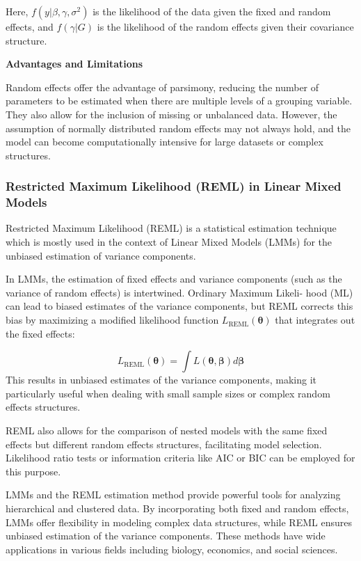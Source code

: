 \documentclass[12pt, twoside,hidelinks]{article}
\theoremstyle{definition}
\numberwithin{equation}{section}
\begin{document}
Here, \( f(y | \beta, \gamma, \sigma^2) \) is the likelihood of the data given the fixed and random effects, and \( f(\gamma | G) \) is the likelihood of the random effects given their covariance structure.
\newline

\textbf{Advantages and Limitations}
\newline

Random effects offer the advantage of parsimony, reducing the number of parameters to be estimated when there are multiple levels of a grouping variable. They also allow for the inclusion of missing or unbalanced data. However, the assumption of normally distributed random effects may not always hold, and the model can become computationally intensive for large datasets or complex structures.



\subsubsection{Restricted Maximum Likelihood (REML) in Linear Mixed Models}
Restricted Maximum Likelihood (REML) is a statistical estimation technique which is mostly used in the context of Linear Mixed Models (LMMs) for the unbiased estimation of variance components.

In LMMs, the estimation of fixed effects and variance components (such
as the variance of random effects) is intertwined. Ordinary Maximum Likeli-
hood (ML) can lead to biased estimates of the variance components, but REML
corrects this bias by maximizing a modified likelihood function \( L_{\text{REML}}(\boldsymbol{\theta}) \) that integrates out the fixed effects: 


\[
L_{\text{REML}}(\boldsymbol{\theta}) = \int L(\boldsymbol{\theta}, \boldsymbol{\beta}) d\boldsymbol{\beta}
\]
This results in unbiased estimates of the variance components, making it particularly useful when dealing with small sample sizes or complex random effects structures.

REML also allows for the comparison of nested models with the same fixed effects but different random effects structures, facilitating model selection. Likelihood ratio tests or information criteria like AIC or BIC can be employed for this purpose.
\newline 

LMMs and the REML estimation method provide powerful tools for analyzing hierarchical and clustered data. By incorporating both fixed and random effects, LMMs offer flexibility in modeling complex data structures, while REML ensures unbiased estimation of the variance components. These methods have wide applications in various fields including biology, economics, and social sciences.
\end{document}
